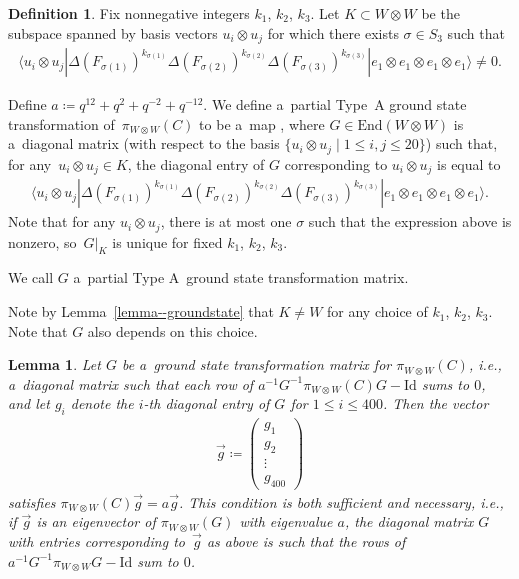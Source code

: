 \documentclass[pdftex]{sigma}
\numberwithin{equation}{section}
\newtheorem{Lemma}[Theorem]{Lemma}
\theoremstyle{definition}
\newtheorem{Definition}[Theorem]{Definition}
\begin{document}
\begin{Definition} \label{definition--PartialTypeAGST}
 Fix nonnegative integers $k_1$, $k_2$, $k_3$. Let $K \subset W \otimes W$ be the subspace spanned by basis vectors $u_i \otimes u_j$ for which there exists $\sigma \in S_3$ such that
 \begin{align*}
 \big\langle u_i \otimes u_j| \Delta(F_{\sigma(1)})^{k_{\sigma(1)}}\Delta(F_{\sigma(2)})^{k_{\sigma(2)}}\Delta(F_{\sigma(3)})^{k_{\sigma(3)}}| e_1 \otimes e_1 \otimes e_1 \otimes e_1 \big\rangle \ne 0.
 \end{align*}

 Define $a \coloneqq q^{12} + q^2 + q^{-2} + q^{-12}$. We define a~partial Type~A ground state transformation of~${\pi_{W \otimes W}(C)}$ to be a~map ,
 where ${G \in \textrm{End}(W \otimes W)}$ is a~diagonal matrix (with respect to the basis $\{u_i \otimes u_j\mid 1 \le i,\allowbreak j \le 20\}$) such that, for any~${u_i \otimes u_j \in K}$, the diagonal entry of $G$ corresponding to $u_i \otimes u_j$ is equal to
 \begin{align*}
 \langle u_i \otimes u_j| \Delta(F_{\sigma(1)})^{k_{\sigma(1)}}\Delta(F_{\sigma(2)})^{k_{\sigma(2)}}\Delta(F_{\sigma(3)})^{k_{\sigma(3)}}| e_1 \otimes e_1 \otimes e_1 \otimes e_1 \rangle.
 \end{align*}
 Note that for any $u_i \otimes u_j$, there is at most one $\sigma$ such that the expression above is nonzero, so~$G|_K$ is unique for fixed $k_1$, $k_2$, $k_3$.

 We call $G$ a~partial Type A~ground state transformation matrix.
\end{Definition}
Note by Lemma~\ref{lemma--groundstate} that $K \ne W$ for any choice of $k_1$, $k_2$, $k_3$. Note that $G$ also depends on this choice.

\begin{Lemma}
\label{lemma--GSTeigenvalue}
 Let $G$ be a~ground state transformation matrix for $\pi_{W \otimes W}(C)$, i.e., a~diagonal matrix such that each row of $a^{-1}G^{-1}\pi_{W \otimes W}(C)G - \mathrm{Id}$ sums to $0$, and let $g_i$ denote the $i$-th diagonal entry of $G$ for $1 \le i \le 400$. Then the vector
 \begin{align*}
 \vec{g} \coloneqq
 \begin{pmatrix}
 g_1 \\
 g_2 \\
 \vdots \\
 g_{400}
 \end{pmatrix}
 \end{align*}
 satisfies $\pi_{W \otimes W}(C) \vec{g} = a\vec{g}$. This condition is both sufficient and necessary, i.e., if $\vec{g}$ is an eigenvector of $\pi_{W \otimes W}(G)$ with eigenvalue $a$, the diagonal matrix $G$ with entries corresponding to~$\vec{g}$ as above is such that the rows of $a^{-1}G^{-1}\pi_{W \otimes W}G - \mathrm{Id}$ sum to $0$.
\end{Lemma}
\end{document}
